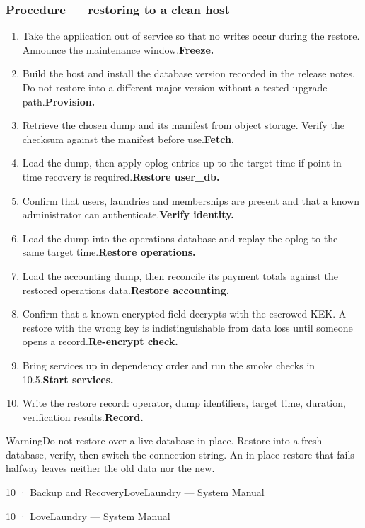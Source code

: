 \documentclass[11pt,a4paper,oneside]{book}
\begin{document}
\subsubsection*{Procedure — restoring to a clean host}
\begin{enumerate}
\item Take the application out of service so that no writes occur during the restore. Announce the maintenance window.\textbf{Freeze.}
\item Build the host and install the database version recorded in the release notes. Do not restore into a different major version without a tested upgrade path.\textbf{Provision.}
\item Retrieve the chosen dump and its manifest from object storage. Verify the checksum against the manifest before use.\textbf{Fetch.}
\item Load the dump, then apply oplog entries up to the target time if point-in-time recovery is required.\textbf{Restore user\_db.}
\item Confirm that users, laundries and memberships are present and that a known administrator can authenticate.\textbf{Verify identity.}
\item Load the dump into the operations database and replay the oplog to the same target time.\textbf{Restore operations.}
\item Load the accounting dump, then reconcile its payment totals against the restored operations data.\textbf{Restore accounting.}
\item Confirm that a known encrypted field decrypts with the escrowed KEK. A restore with the wrong key is indistinguishable from data loss until someone opens a record.\textbf{Re-encrypt check.}
\item Bring services up in dependency order and run the smoke checks in 10.5.\textbf{Start services.}
\item Write the restore record: operator, dump identifiers, target time, duration, verification results.\textbf{Record.}
\end{enumerate}
\begin{notebox}WarningDo not restore over a live database in place. Restore into a fresh database, verify, then switch the connection string. An in-place restore that fails halfway leaves neither the old data nor the new.\end{notebox}
10 · Backup and RecoveryLoveLaundry — System Manual

10 · LoveLaundry — System Manual
\end{document}
